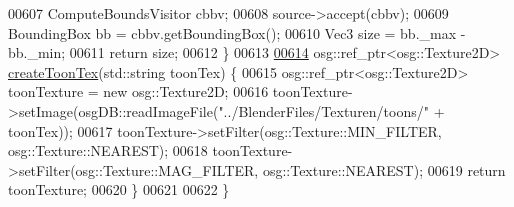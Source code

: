 \begin{DoxyCode}
00607         ComputeBoundsVisitor cbbv;
00608         source->accept(cbbv);
00609         BoundingBox bb = cbbv.getBoundingBox();
00610         Vec3 size = bb.\_max - bb.\_min;
00611         \textcolor{keywordflow}{return} size;
00612     \}
00613 
\hypertarget{_util_functions_8cpp_source_l00614}{}\hyperlink{namespacebrtr_aea7b3b188858f0bce09f2450a749f497}{00614}     osg::ref\_ptr<osg::Texture2D> \hyperlink{namespacebrtr_aea7b3b188858f0bce09f2450a749f497}{createToonTex}(std::string toonTex) \{
00615         osg::ref\_ptr<osg::Texture2D> toonTexture = \textcolor{keyword}{new} osg::Texture2D;
00616         toonTexture->setImage(osgDB::readImageFile(\textcolor{stringliteral}{"../BlenderFiles/Texturen/toons/"} + toonTex));
00617         toonTexture->setFilter(osg::Texture::MIN\_FILTER, osg::Texture::NEAREST);
00618         toonTexture->setFilter(osg::Texture::MAG\_FILTER, osg::Texture::NEAREST);
00619         \textcolor{keywordflow}{return} toonTexture;
00620     \}
00621 
00622 \}
\end{DoxyCode}
